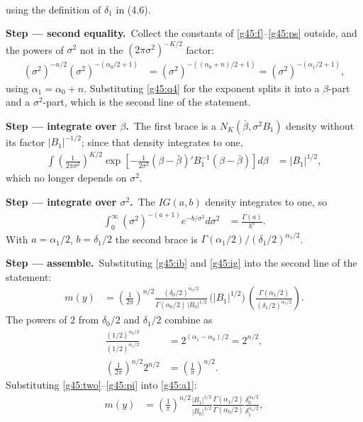 \documentclass[11pt,a4paper]{article}
\newcommand{\passo}[2]{\par\smallskip\noindent\textbf{Step --- #1.}~#2}
\begin{document}
\begin{sol}
{\begin{align}
\end{align}
using the definition of $\delta_1$ in (4.6).}
\passo{second equality}{Collect the constants of \eqref{g45:f}--\eqref{g45:ps} outside, and the powers of $\sigma^2$ not in the $(2\pi\sigma^2)^{-K/2}$ factor:
\begin{align}
(\sigma^2)^{-n/2}(\sigma^2)^{-(\alpha_0/2+1)}&=(\sigma^2)^{-((\alpha_0+n)/2+1)}=(\sigma^2)^{-(\alpha_1/2+1)},\label{g45:pow}
\end{align}
using $\alpha_1=\alpha_0+n$. Substituting \eqref{g45:q4} for the exponent splits it into a $\beta$-part and a $\sigma^2$-part, which is the second line of the statement.}
\passo{integrate over $\beta$}{The first brace is a $N_K(\bar\beta,\sigma^2B_1)$ density without its factor $|B_1|^{-1/2}$; since that density integrates to one,
\begin{align}
\int\left(\frac{1}{2\pi\sigma^2}\right)^{K/2}\exp\left[-\tfrac{1}{2\sigma^2}(\beta-\bar\beta)'B_1^{-1}(\beta-\bar\beta)\right]d\beta&=|B_1|^{1/2},\label{g45:ib}
\end{align}
which no longer depends on $\sigma^2$.}
\passo{integrate over $\sigma^2$}{The $IG(a,b)$ density integrates to one, so
\begin{align}
\int_0^\infty(\sigma^2)^{-(a+1)}e^{-b/\sigma^2}d\sigma^2&=\frac{\Gamma(a)}{b^{a}}.\label{g45:ig}
\end{align}
With $a=\alpha_1/2$, $b=\delta_1/2$ the second brace is $\Gamma(\alpha_1/2)/(\delta_1/2)^{\alpha_1/2}$.}
\passo{assemble}{Substituting \eqref{g45:ib} and \eqref{g45:ig} into the second line of the statement:
\begin{align}
m(y)&=\left(\frac{1}{2\pi}\right)^{n/2}\frac{(\delta_0/2)^{\alpha_0/2}}{\Gamma(\alpha_0/2)\,|B_0|^{1/2}}\,\big(|B_1|^{1/2}\big)\,\left(\frac{\Gamma(\alpha_1/2)}{(\delta_1/2)^{\alpha_1/2}}\right).\label{g45:a1}
\end{align}
The powers of $2$ from $\delta_0/2$ and $\delta_1/2$ combine as
\begin{align}
\frac{(1/2)^{\alpha_0/2}}{(1/2)^{\alpha_1/2}}&=2^{(\alpha_1-\alpha_0)/2}=2^{n/2},\label{g45:two}\\
\left(\frac{1}{2\pi}\right)^{n/2}2^{n/2}&=\left(\frac1\pi\right)^{n/2}.\label{g45:pi}
\end{align}
Substituting \eqref{g45:two}--\eqref{g45:pi} into \eqref{g45:a1}:
\begin{align}
m(y)&=\left(\frac{1}{\pi}\right)^{n/2}\frac{|B_1|^{1/2}}{|B_0|^{1/2}}\frac{\Gamma(\alpha_1/2)}{\Gamma(\alpha_0/2)}\frac{\delta_0^{\alpha_0/2}}{\delta_1^{\alpha_1/2}},\label{g45:ans}

\end{align}}
\end{sol}
\end{document}
